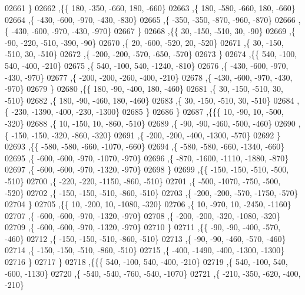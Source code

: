 \begin{DoxyCode}
02661     \}
02662    ,\{\{   180,  -350,  -660,   180,  -660\}
02663     ,\{   180,  -580,  -660,   180,  -660\}
02664     ,\{  -430,  -600,  -970,  -430,  -830\}
02665     ,\{  -350,  -350,  -870,  -960,  -870\}
02666     ,\{  -430,  -600,  -970,  -430,  -970\}
02667     \}
02668    ,\{\{    30,  -150,  -510,    30,   -90\}
02669     ,\{   -90,  -220,  -510,  -390,   -90\}
02670     ,\{    20,  -600,  -520,    20,  -520\}
02671     ,\{    30,  -150,  -510,    30,  -510\}
02672     ,\{  -200,  -200,  -570,  -650,  -570\}
02673     \}
02674    ,\{\{   540,  -100,   540,  -400,  -210\}
02675     ,\{   540,  -100,   540, -1240,  -810\}
02676     ,\{  -430,  -600,  -970,  -430,  -970\}
02677     ,\{  -200,  -200,  -260,  -400,  -210\}
02678     ,\{  -430,  -600,  -970,  -430,  -970\}
02679     \}
02680    ,\{\{   180,   -90,  -400,   180,  -460\}
02681     ,\{    30,  -150,  -510,    30,  -510\}
02682     ,\{   180,   -90,  -460,   180,  -460\}
02683     ,\{    30,  -150,  -510,    30,  -510\}
02684     ,\{  -230, -1390,  -400,  -230, -1300\}
02685     \}
02686    \}
02687   ,\{\{\{    10,   -90,    10,  -500,  -320\}
02688     ,\{    10,  -150,    10,  -860,  -510\}
02689     ,\{   -90,   -90,  -460,  -500,  -460\}
02690     ,\{  -150,  -150,  -320,  -860,  -320\}
02691     ,\{  -200,  -200,  -400, -1300,  -570\}
02692     \}
02693    ,\{\{  -580,  -580,  -660, -1070,  -660\}
02694     ,\{  -580,  -580,  -660, -1340,  -660\}
02695     ,\{  -600,  -600,  -970, -1070,  -970\}
02696     ,\{  -870, -1600, -1110, -1880,  -870\}
02697     ,\{  -600,  -600,  -970, -1320,  -970\}
02698     \}
02699    ,\{\{  -150,  -150,  -510,  -500,  -510\}
02700     ,\{  -220,  -220, -1150,  -860,  -510\}
02701     ,\{  -500, -1070,  -750,  -500,  -520\}
02702     ,\{  -150,  -150,  -510,  -860,  -510\}
02703     ,\{  -200,  -200,  -570, -1750,  -570\}
02704     \}
02705    ,\{\{    10,  -200,    10, -1080,  -320\}
02706     ,\{    10,  -970,    10, -2450, -1160\}
02707     ,\{  -600,  -600,  -970, -1320,  -970\}
02708     ,\{  -200,  -200,  -320, -1080,  -320\}
02709     ,\{  -600,  -600,  -970, -1320,  -970\}
02710     \}
02711    ,\{\{   -90,   -90,  -400,  -570,  -460\}
02712     ,\{  -150,  -150,  -510,  -860,  -510\}
02713     ,\{   -90,   -90,  -460,  -570,  -460\}
02714     ,\{  -150,  -150,  -510,  -860,  -510\}
02715     ,\{  -400, -1490,  -400, -1300, -1300\}
02716     \}
02717    \}
02718   ,\{\{\{   540,  -100,   540,  -400,  -210\}
02719     ,\{   540,  -100,   540,  -600, -1130\}
02720     ,\{  -540,  -540,  -760,  -540, -1070\}
02721     ,\{  -210,  -350,  -620,  -400,  -210\}

\end{DoxyCode}
